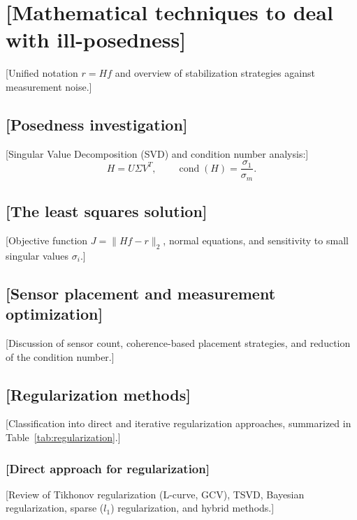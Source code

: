 \documentclass[final,5p,times,twocolumn]{elsarticle}
\begin{document}
\section{[Mathematical techniques to deal with ill-posedness]}\label{sec:sec5}

[Unified notation $r = H f$ and overview of stabilization strategies against measurement noise.]

\subsection{[Posedness investigation]}\label{subsec:sec5_1}

[Singular Value Decomposition (SVD) and condition number analysis:]
\begin{equation}\label{eq:svd}
    H = U \Sigma V^{T}, \qquad \operatorname{cond}(H) = \frac{\sigma_{1}}{\sigma_{m}}.
\end{equation}

\subsection{[The least squares solution]}\label{subsec:sec5_2}

[Objective function $J = \| H f - r \|_{2}$, normal equations, and sensitivity to small singular values $\sigma_{i}$.]

\subsection{[Sensor placement and measurement optimization]}\label{subsec:sec5_3}

[Discussion of sensor count, coherence-based placement strategies, and reduction of the condition number.]

\subsection{[Regularization methods]}\label{subsec:sec5_4}

[Classification into direct and iterative regularization approaches, summarized in Table~\ref{tab:regularization}.]

\subsubsection{[Direct approach for regularization]}\label{subsubsec:sec5_4_1}

[Review of Tikhonov regularization (L-curve, GCV), TSVD, Bayesian regularization, sparse ($l_{1}$) regularization, and hybrid methods.]
\end{document}

